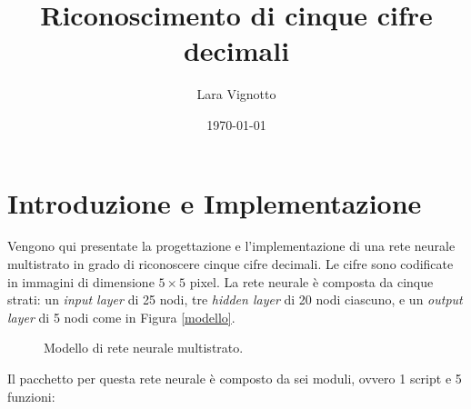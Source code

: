\documentclass[a4paper,12pt]{article}
\title{\textbf{Riconoscimento di cinque cifre decimali}}
\author{Lara Vignotto}
\date{\today}
\begin{document}
\maketitle
\vfill
\tableofcontents
\vspace{5cm}


\newpage
\section{Introduzione e Implementazione}

Vengono qui presentate la progettazione e l'implementazione di una rete neurale multistrato in grado di riconoscere cinque cifre decimali. Le cifre sono codificate in immagini di dimensione $5\times5$ pixel. La rete neurale è composta da cinque strati: un \emph{input layer} di 25 nodi, tre \emph{hidden layer} di 20 nodi ciascuno, e un \emph{output layer} di 5 nodi come in Figura \vref{modello}.

\begin{figure}[htb]
    \centering
    \caption{Modello di rete neurale multistrato.}
    \label{modello}
\end{figure}

Il pacchetto per questa rete neurale è composto da sei moduli, ovvero 1 script e 5 funzioni:
\end{document}
